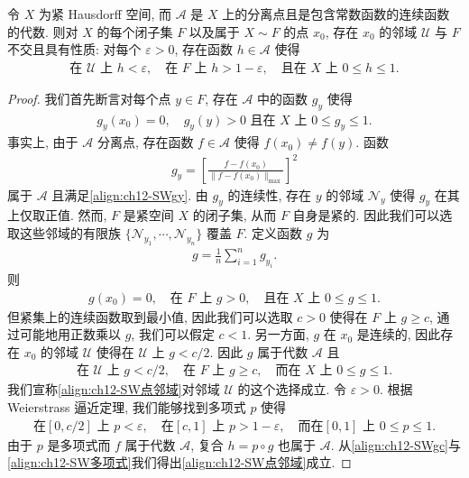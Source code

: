 \documentclass[../../main.tex]{subfiles}
\begin{document}
\begin{lemma}\label{lemma:ch12-SW点逼近}
令 $X$ 为紧 Hausdorff 空间, 而 $\mathcal{A}$ 是 $X$ 上的分离点且是包含常数函数的连续函数的代数. 则对 $X$ 的每个闭子集 $F$ 以及属于 $X\sim F$ 的点 $x_{0}$, 存在 $x_{0}$ 的邻域 $\mathcal{U}$ 与 $F$ 不交且具有性质: 对每个 $\varepsilon>0$, 存在函数 $h\in\mathcal{A}$ 使得
\begin{align}
\text{在 }\mathcal{U}\text{ 上 }h<\varepsilon,\quad\text{在 }F\text{ 上 }h>1-\varepsilon,\quad\text{且在 }X\text{ 上 }0\leqslant h\leqslant 1.\label{align:ch12-SW点邻域}
\end{align}
\end{lemma}

\begin{proof}
我们首先断言对每个点 $y\in F$, 存在 $\mathcal{A}$ 中的函数 $g_{y}$ 使得
\begin{align}
g_{y}(x_{0})=0,\quad g_{y}(y)>0\text{ 且在 }X\text{ 上 }0\leqslant g_{y}\leqslant 1.\label{align:ch12-SWgy}
\end{align}
事实上, 由于 $\mathcal{A}$ 分离点, 存在函数 $f\in\mathcal{A}$ 使得 $f(x_{0})\neq f(y)$. 函数
\begin{align*}
g_{y}=\left[\frac{f-f(x_{0})}{\|f-f(x_{0})\|_{\max}}\right]^{2}
\end{align*}
属于 $\mathcal{A}$ 且满足\eqref{align:ch12-SWgy}. 由 $g_{y}$ 的连续性, 存在 $y$ 的邻域 $\mathcal{N}_{y}$ 使得 $g_{y}$ 在其上仅取正值. 然而, $F$ 是紧空间 $X$ 的闭子集, 从而 $F$ 自身是紧的. 因此我们可以选取这些邻域的有限族 $\{\mathcal{N}_{y_{1}},\cdots,\mathcal{N}_{y_{n}}\}$ 覆盖 $F$. 定义函数 $g$ 为
\begin{align*}
g=\frac{1}{n}\sum_{i=1}^{n}g_{y_{i}}.
\end{align*}
则
\begin{align}
g(x_{0})=0,\quad\text{在 }F\text{ 上 }g>0,\quad\text{且在 }X\text{ 上 }0\leqslant g\leqslant 1.\label{align:ch12-SWg}
\end{align}
但紧集上的连续函数取到最小值, 因此我们可以选取 $c>0$ 使得在 $F$ 上 $g\geqslant c$, 通过可能地用正数乘以 $g$, 我们可以假定 $c<1$. 另一方面, $g$ 在 $x_{0}$ 是连续的, 因此存在 $x_{0}$ 的邻域 $\mathcal{U}$ 使得在 $\mathcal{U}$ 上 $g<c/2$. 因此 $g$ 属于代数 $\mathcal{A}$ 且
\begin{align}
\text{在 }\mathcal{U}\text{ 上 }g<c/2,\quad\text{在 }F\text{ 上 }g\geqslant c,\quad\text{而在 }X\text{ 上 }0\leqslant g\leqslant 1.\label{align:ch12-SWgc}
\end{align}
我们宣称\eqref{align:ch12-SW点邻域}对邻域 $\mathcal{U}$ 的这个选择成立. 令 $\varepsilon>0$. 根据 Weierstrass 逼近定理, 我们能够找到多项式 $p$ 使得
\begin{align}
\text{在}[0,c/2]\text{ 上 }p<\varepsilon,\quad\text{在}[c,1]\text{ 上 }p>1-\varepsilon,\quad\text{而在}[0,1]\text{ 上 }0\leqslant p\leqslant 1.\label{align:ch12-SW多项式}
\end{align}
由于 $p$ 是多项式而 $f$ 属于代数 $\mathcal{A}$, 复合 $h=p\circ g$ 也属于 $\mathcal{A}$. 从\eqref{align:ch12-SWgc}与\eqref{align:ch12-SW多项式}我们得出\eqref{align:ch12-SW点邻域}成立.
\end{proof}
\end{document}
